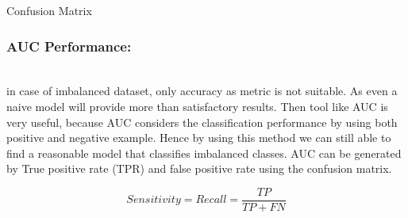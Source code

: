\begin{table}[]


    
    \caption{Confusion Matrix}
    \label{tab:Confusion Matrix}
\end{table}




\subsubsection{AUC Performance:}\hspace*{\fill} \\
in case of imbalanced dataset, only accuracy as metric is not suitable. As even a naive model will provide more than satisfactory results. Then tool like AUC is very useful, because AUC considers the classification performance by using both positive and negative example. Hence by using this method we can still able to find a reasonable model that classifies imbalanced classes. AUC can be generated by True positive rate (TPR) and false positive rate using the confusion matrix. 



\begin{equation} \label{eq:Sensitivity}
    Sensitivity = Recall = \frac{TP}{TP+FN}
\end{equation}

